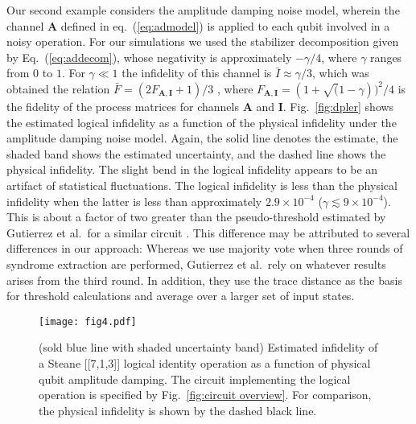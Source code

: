 \documentclass[twocolumn,pra]{revtex4}
\begin{document}
Our second example considers the amplitude damping noise model, wherein the channel $\mathbf{A}$ defined in eq.~(\ref{eq:admodel}) is applied to each qubit involved in a noisy operation. For our simulations we used the stabilizer decomposition given by Eq.~(\ref{eq:addecom}), whose negativity is approximately $-\gamma/4$, where $\gamma$ ranges from $0$ to $1$.   For $\gamma\ll 1$ the infidelity of this channel is $\bar{I}\approx \gamma/3$, which was obtained the relation $\bar{F} = (2 F_\mathbf{A,I} + 1)/3$ \cite{Nielsen2002}, where $F_\mathbf{A,I} = (1+\sqrt(1-\gamma))^2/4$ is the fidelity of the process matrices for channels $\mathbf{A}$ and $\mathbf{I}$.  Fig.~\ref{fig:dpler} shows the estimated logical infidelity as a function of the physical infidelity under the amplitude damping noise model. Again, the solid line denotes the estimate, the shaded band shows the estimated uncertainty, and the dashed line shows the physical infidelity. The slight bend in the logical infidelity appears to be an artifact of statistical fluctuations. The logical infidelity is less than the physical infidelity when the latter is less than approximately $2.9 \times 10^{-4}$ ($\gamma \lesssim 9 \times 10^{-4}$).  This is about a factor of two greater than the pseudo-threshold estimated by Gutierrez et al.~for a similar circuit \cite{Gutierrez2015}. This difference may be attributed to several differences in our approach: Whereas we use majority vote when three rounds of syndrome extraction are performed, Gutierrez et al.~rely on whatever results arises from the third round. In addition, they use the trace distance as the basis for threshold calculations and average over a larger set of input states. 
\begin{figure}
\centering
\texttt{[image: fig4.pdf]}
\caption{(sold blue line with shaded uncertainty band) Estimated infidelity of a  Steane [[7,1,3]] logical identity operation as a function of physical qubit amplitude damping.  The circuit implementing the logical operation is specified by Fig.~\ref{fig:circuit overview}. For comparison, the physical infidelity is shown by the dashed black line.}
\label{fig:adhler}
\end{figure}
\end{document}
